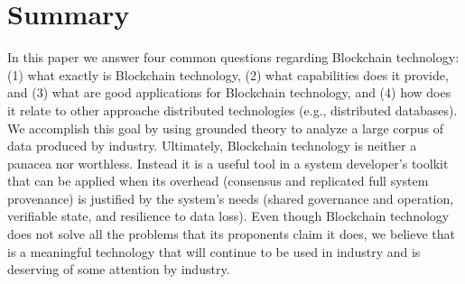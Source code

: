 
\section{Summary}
In this paper we answer four common questions regarding Blockchain technology: (1) what exactly is Blockchain technology, (2) what capabilities does it provide, and (3) what are good applications for Blockchain technology, and (4) how does it relate to other approache distributed technologies (e.g., distributed databases).
We accomplish this goal by using grounded theory to analyze a large corpus of data produced by industry.
Ultimately, Blockchain technology is neither a panacea nor worthless.
Instead it is a useful tool in a system developer's toolkit that can be applied when its overhead (consensus and replicated full system provenance) is justified by the system's needs (shared governance and operation, verifiable state, and resilience to data loss).
Even though Blockchain technology does not solve all the problems that its proponents claim it does, we believe that is a meaningful technology that will continue to be used in industry and is deserving of some attention by industry.